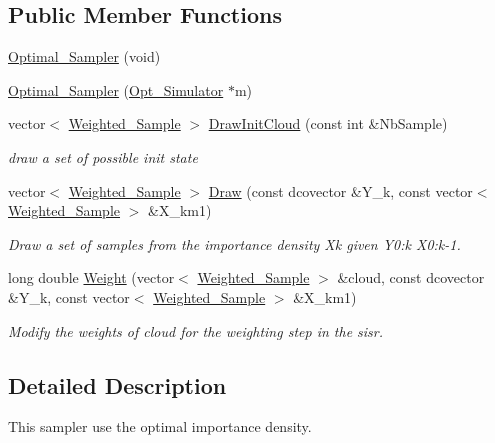 \subsection*{Public Member Functions}
\begin{CompactItemize}
\item 
\hyperlink{class_optimal___sampler_0d07b22c5c1e33ecd586059dd5cf739e}{Optimal\_\-Sampler} (void)
\item 
\hyperlink{class_optimal___sampler_c93d1bd8e4855c1867f51b941060717b}{Optimal\_\-Sampler} (\hyperlink{class_opt___simulator}{Opt\_\-Simulator} $\ast$m)
\item 
vector$<$ \hyperlink{class_weighted___sample}{Weighted\_\-Sample} $>$ \hyperlink{class_optimal___sampler_d1f49e39bf83898c19c044a3874c6930}{DrawInitCloud} (const int \&NbSample)
\begin{CompactList}\small\item\em draw a set of possible init state \item\end{CompactList}\item 
vector$<$ \hyperlink{class_weighted___sample}{Weighted\_\-Sample} $>$ \hyperlink{class_optimal___sampler_1a9288b91deaab91d0c3d3511d6e1892}{Draw} (const dcovector \&Y\_\-k, const vector$<$ \hyperlink{class_weighted___sample}{Weighted\_\-Sample} $>$ \&X\_\-km1)
\begin{CompactList}\small\item\em Draw a set of samples from the importance density Xk given Y0:k X0:k-1. \item\end{CompactList}\item 
long double \hyperlink{class_optimal___sampler_376a6addc54dd14aee7f1367c183e100}{Weight} (vector$<$ \hyperlink{class_weighted___sample}{Weighted\_\-Sample} $>$ \&cloud, const dcovector \&Y\_\-k, const vector$<$ \hyperlink{class_weighted___sample}{Weighted\_\-Sample} $>$ \&X\_\-km1)
\begin{CompactList}\small\item\em Modify the weights of cloud for the weighting step in the sisr. \item\end{CompactList}\end{CompactItemize}


\subsection{Detailed Description}
This sampler use the optimal importance density. 



